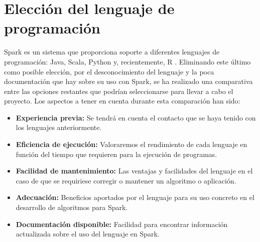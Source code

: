 


\section{Elección del lenguaje de programación}\label{EleccionLenguaje}

Spark es un sistema que proporciona soporte a diferentes lenguajes de programación: Java, Scala, Python y, recientemente, R \cite{SparkDoc}. Eliminando este último como posible elección, por el desconocimiento del lenguaje y la poca documentación que hay sobre su uso con Spark, se ha realizado una comparativa entre las opciones restantes que podrían seleccionarse para llevar a cabo el proyecto. Los aspectos a tener en cuenta durante esta comparación han sido: \\

\begin{itemize}
	\item \textbf{Experiencia previa:} Se tendrá en cuenta el contacto que se haya tenido con los lenguajes anteriormente.
	\item \textbf{Eficiencia de ejecución:} Valoraremos el rendimiento de cada lenguaje en función del tiempo que requieren para la ejecución de programas. 
	\item \textbf{Facilidad de mantenimiento:}  Las ventajas y facilidades del lenguaje en el caso de que se requiriese corregir o mantener un algoritmo o aplicación. 
	\item \textbf{Adecuación:} Beneficios aportados por el lenguaje para su uso concreto en el desarrollo de algoritmos para Spark.


	\item \textbf{Documentación disponible:} Facilidad para encontrar información actualizada sobre el uso del lenguaje en Spark.
	
\end{itemize}

